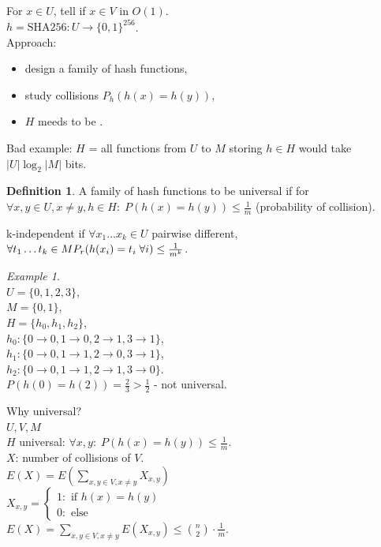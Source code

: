 \documentclass[a4paper, 12pt]{book}
\theoremstyle{definition}
\newtheorem{defn}[counter]{Definition}
\theoremstyle{remark}
\newtheorem*{ex}{Example}
\begin{document}
For $x \in U$, tell if $x \in V$ in $O(1)$. \\
$h = \text{SHA256}: U \to \{0, 1\}^{256}$. \\
Approach:
\begin{itemize}
  \item design a family of hash functions,
  \item study collisions $P_h(h(x) = h(y))$,
  \item $H$ meeds to be .
\end{itemize}
Bad example: $H$ = all functions from $U$ to $M$ storing $h \in H$ would take $|U| \log_2 |M|$ bits.
\begin{defn}
  A family of hash functions to be universal if for \\
  $\forall x, y \in U, x \neq y, h \in H: \; P(h(x) = h(y)) \leq \frac{1}{m}$ (probability of collision).
\end{defn}
k-independent if $\forall x_1 \dots x_k \in U$ pairwise different, $\forall t_1 \dots t_k \in M \\
P_r(h(x_i) = t_i \; \forall i) \leq \frac{1}{m^k}$.
\begin{ex} \text{} \\
  $U = \{0, 1, 2, 3\}$, \\
  $M = \{0, 1\}$, \\
  $H = \{h_0, h_1, h_2\}$, \\
  $h_0: \{0 \to 0, 1 \to 0, 2 \to 1, 3 \to 1\}$, \\
  $h_1: \{0 \to 0, 1 \to 1, 2 \to 0, 3 \to 1\}$, \\
  $h_2: \{0 \to 0, 1 \to 1, 2 \to 1, 3 \to 0\}$. \\
  $P(h(0) = h(2)) = \frac{2}{3} > \frac{1}{2}$ - not universal.
\end{ex}
Why universal? \\
$U, V, M$ \\
$H$ universal: $\forall x, y: \; P(h(x) = h(y)) \leq \frac{1}{m}$. \\
$X$: number of collisions of $V$. \\
$E(X) = E\left(\sum_{x,y \in V, x \neq y} X_{x,y}\right)$ \\
$X_{x,y} = \begin{cases}
  1: \text{ if } h(x) = h(y) \\
  0: \text{ else}
\end{cases}$ \\
$E(X) = \sum_{x,y \in V, x \neq y} E(X_{x,y}) \leq \binom{n}{2} \cdot \frac{1}{m}$. \\
\end{document}
